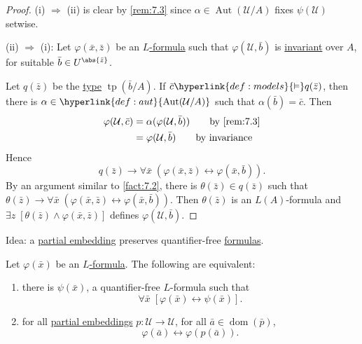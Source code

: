 \documentclass{article}
\let\models\vDash
\DeclareMathOperator{\Aut}{Aut}
\DeclareMathOperator{\dom}{dom}
\DeclareMathOperator{\tp}{tp}
\newcommand{\named}[1]{\textbf{#1}\index{#1}}
\begin{document}
\begin{proof}
  (i) $\Rightarrow$ (ii) is clear by \cref{rem:7.3} since $\alpha \in \Aut(\mathcal{U}/A)$ fixes $\psi(\mathcal{U})$ setwise.

  (ii) $\Rightarrow$ (i): Let $\varphi(\bar{x},\bar{z})$ be an \hyperlink{def:form}{$L$-formula} such that $\varphi(\mathcal{U},\bar{b})$ is \hyperlink{def:inv}{invariant} over $A$, for suitable $ \bar{b} \in U^{\abs{\bar{z}}}$.

  Let $q(\bar{z})$ be the \hyperlink{def:type}{type} $\tp(\bar{b}/A)$.
  If $ \bar{c}\hyperlink{def:models}{\models} q(\bar{z}) $, then there is $ \alpha\in\hyperlink{def:aut}{\Aut(\mathcal{U}/A)}$
  such that $\alpha(\bar{b})=\bar{c}$.
  Then
    \begin{align*}
      \varphi(\mathcal{U},\bar{c})&=\alpha(\varphi(\mathcal{U},\bar{b}))\qquad\text{by \cref{rem:7.3}} \\
                                       &= \varphi(\mathcal{U},\bar{b})\qquad\text{by invariance}
    \end{align*}
  Hence
  \begin{equation*}
    q(\bar{z})\to \forall\bar{x}\;(\varphi(\bar{x},\bar{z})\leftrightarrow\varphi(\bar{x},\bar{b})).
  \end{equation*}
  By an argument similar to \cref{fact:7.2},
  there is $\theta(\bar{z})\in q(\bar{z})$ such that $\theta(\bar{z})\to\forall\bar{x}\;(\varphi(\bar{x},\bar{z})\leftrightarrow\varphi(\bar{x},\bar{b}))$.
  Then $\theta(\bar{z})$ is an $L(A)$-formula and $\exists z\;[\theta(\bar{z})\land\varphi(\bar{x},\bar{z})]$ defines $ \varphi(\mathcal{U},\bar{b}) $.
\end{proof}
Idea: a \hyperlink{def:upe}{partial embedding} preserves quantifier-free \hyperlink{def:form}{formulas}.
\begin{nprop}\label{prop:7.7}
  Let $\varphi(\bar{x})$ be an \hyperlink{def:form}{$L$-formula}. The following are equivalent:
  \begin{enumerate}[label=(\roman*)]
    \item there is $\psi(\bar{x})$, a quantifier-free $L$-formula such that
      \begin{equation*}
        \forall \bar x\; [\varphi(\bar{x}) \leftrightarrow \psi(\bar{x})].
      \end{equation*}
    \item for all \hyperlink{def:upe}{partial embeddings} $p: \mathcal{U} \to \mathcal{U}$, for all $\bar{a} \in \dom(\bar{p})$,
      \begin{equation*}
        \varphi(\bar{a}) \leftrightarrow \varphi(p(\bar{a})).
      \end{equation*}
  \end{enumerate}
\end{nprop}
\end{document}
